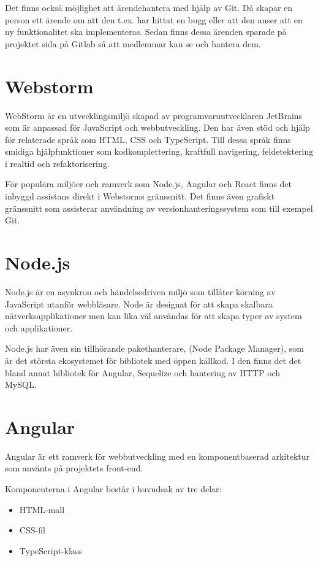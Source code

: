 Det finns också möjlighet att ärendehantera med hjälp av Git.
Då skapar en person ett ärende om att den t.ex. har hittat en bugg eller att den anser att en ny funktionalitet ska implementeras.
Sedan finns dessa ärenden sparade på projektet sida på Gitlab så att medlemmar kan se och hantera dem. \cite{gitlab}

\section{Webstorm}
WebStorm är en utvecklingsmiljö skapad av programvaruutvecklaren JetBrains som är anpassad för JavaScript och webbutveckling. Den har även stöd och hjälp för relaterade språk som HTML, CSS och TypeScript. Till dessa språk finns smidiga hjälpfunktioner som kodkomplettering, kraftfull navigering, feldetektering i realtid och refaktorisering. 

För populära miljöer och ramverk som Node.js, Angular och React finns det inbyggd assistans direkt i Webstorms gränssnitt. Det finns även grafiskt gränssnitt som assisterar användning av versionhanteringssystem som till exempel Git.\cite{webstorm}
\section{Node.js}
Node.js är en asynkron och händelsedriven miljö som tillåter körning av JavaScript utanför webbläsare. Node är designat för att skapa skalbara nätverksapplikationer men kan lika väl användas för att skapa typer av system och applikationer. \cite{nodejs}

Node.js har även sin tillhörande pakethanterare, (Node Package Manager), som är det största ekosystemet för bibliotek med öppen källkod. \cite{npm}
I den finns det det bland annat bibliotek för Angular, Sequelize och hantering av HTTP och MySQL.

\section{Angular}
Angular är ett ramverk för webbutveckling med en komponentbaserad arkitektur som använts på projektets front-end. 

Komponenterna i Angular består i huvudsak av tre delar:

\begin{itemize} 
\item HTML-mall 
\item CSS-fil
\item TypeScript-klass 
\end{itemize}

